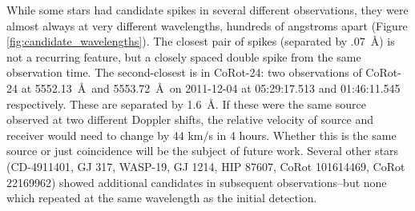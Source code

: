 \documentclass[twocolumn]{aastex701}
\begin{document}
While some stars had candidate spikes in several different observations, they were almost always at very different wavelengths, hundreds of angstroms apart (Figure \ref{fig:candidate_wavelengths}).  The closest pair of spikes (separated by .07~\AA) is not a recurring feature, but a closely spaced  double spike from the same observation time. The second-closest is in CoRot-24: two observations of CoRot-24 at 5552.13~\AA~and 5553.72~\AA~on 2011-12-04 at 05:29:17.513 and 01:46:11.545 respectively.  These are separated by 1.6~\AA.  If these were the same source observed at two different Doppler shifts, the relative velocity of source and receiver would need to change by 44 km/s in 4 hours. Whether this is the same source or just coincidence will be the subject of future work. Several  other stars (CD-4911401, GJ 317, WASP-19, GJ 1214, HIP 87607, CoRot  101614469, CoRot  22169962) showed additional candidates in subsequent observations--but none which repeated at the same wavelength as the initial detection. 
\end{document}

